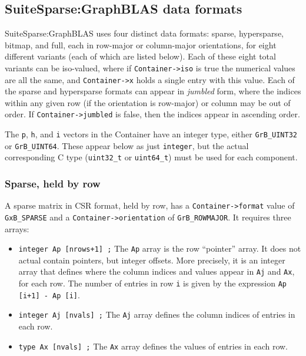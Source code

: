 \newpage
\subsection{SuiteSparse:GraphBLAS data formats}
\label{formats}

SuiteSparse:GraphBLAS uses four distinct data formats: sparse, hypersparse,
bitmap, and full, each in row-major or column-major orientations, for eight
different variants (each of which are listed below).
Each of these eight total variants can be iso-valued, where if
\verb'Container->iso' is true the numerical values are all the same, and
\verb'Container->x' holds a single entry with this value.
Each of the sparse and hypersparse formats can appear in {\em jumbled} form,
where the indices within any given row (if the orientation is row-major)
or column may be out of order.  If \verb'Container->jumbled' is false, then
the indices appear in ascending order.

The \verb'p', \verb'h', and \verb'i' vectors in the Container have an integer
type, either \verb'GrB_UINT32' or \verb'GrB_UINT64'.  These appear below as
just \verb'integer', but the actual corresponding C type (\verb'uint32_t' or
\verb'uint64_t') must be used for each component.

\subsubsection{Sparse, held by row}
\label{format_sparse_by_row}

A sparse matrix in CSR format, held by row, has a \verb'Container->format'
value of \verb'GxB_SPARSE' and a \verb'Container->orientation' of
\verb'GrB_ROWMAJOR'.  It requires three arrays:

\begin{itemize}
\item \verb'integer Ap [nrows+1] ;'  The \verb'Ap' array is the row
``pointer'' array.  It does not actual contain pointers, but integer offsets.
More precisely, it is an integer array that defines where the column indices
and values appear in \verb'Aj' and \verb'Ax', for each row.  The number of
entries in row \verb'i' is given by the expression \verb'Ap [i+1] - Ap [i]'.

\item \verb'integer Aj [nvals] ;'  The \verb'Aj' array defines the
column indices of entries in each row.

\item \verb'type Ax [nvals] ;'  The \verb'Ax' array defines the values of
entries in each row.  
\end{itemize}

